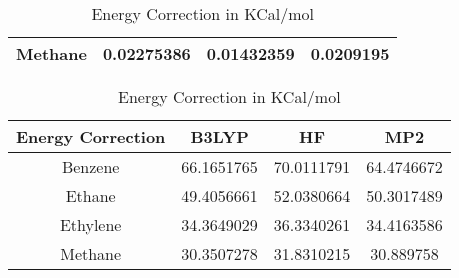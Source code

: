 \begin{table}[htbp]
\begin{subtable}[h]{\textwidth}
\begin{tabular}{|c|c|c|c|}
Methane            & 0.02275386 & 0.01432359 & 0.0209195  \\ \hline
\end{tabular}
\caption{Vibrational Energy in KCal/mol}
\end{subtable}
\vspace{\fill}
\begin{subtable}[h]{\textwidth}
\vspace*{1 cm}
\centering
\begin{tabular}{|c|c|c|c|}
\hline
Energy Correction  & B3LYP      & HF         & MP2        \\ \hline
Benzene            & 66.1651765 & 70.0111791 & 64.4746672 \\
Ethane             & 49.4056661 & 52.0380664 & 50.3017489 \\
Ethylene           & 34.3649029 & 36.3340261 & 34.4163586 \\
Methane            & 30.3507278 & 31.8310215 & 30.889758  \\ \hline
\end{tabular}
\caption{Energy Correction in KCal/mol}
\end{subtable}
\end{table}
\clearpage